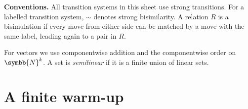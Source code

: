 \documentclass[11pt,a4paper,lmodern]{tutorial}
\DeclareRobustCommand{\N}{\symbb{N}}
\DeclareRobustCommand{\N}{\mathbb{N}}
\begin{document}
\maketitle

\textbf{Conventions.}
All transition systems in this sheet use strong transitions.
For a labelled transition system, $\sim$ denotes strong bisimilarity.
A relation $R$ is a bisimulation if every move from either side can be
matched by a move with the same label, leading again to a pair in $R$.

For vectors we use componentwise addition and the componentwise order on
$\N^k$.  A set is \emph{semilinear} if it is a finite union of linear sets.


\section{A finite warm-up}
\end{document}
